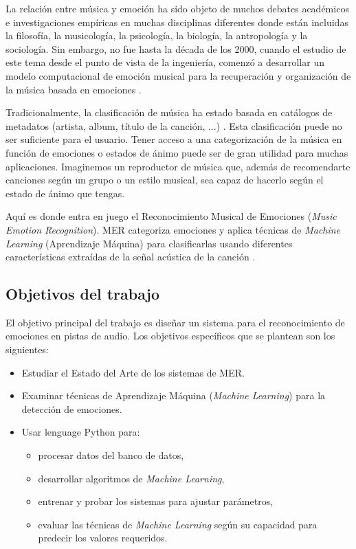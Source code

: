 \documentclass[12pt,a4paper]{article}
\begin{document}
La relación entre música y emoción ha sido objeto de muchos debates académicos e investigaciones empíricas en muchas disciplinas diferentes donde están incluidas la filosofía, la musicología, la psicología, la biología, la antropología y la sociología. Sin embargo, no fue hasta la década de los 2000, cuando el estudio de este tema desde el punto de vista de la ingeniería, comenzó a desarrollar un modelo computacional de emoción musical para la recuperación y organización de la música basada en emociones \cite{yang2011music}.


Tradicionalmente, la clasificación de música ha estado basada en catálogos de metadatos (artista, album, título de la canción, ...) \cite{yang2011music}. Esta clasificación puede no ser suficiente para el usuario. Tener acceso a una categorización de la música en función de emociones o estados de ánimo puede ser de gran utilidad para muchas aplicaciones. Imaginemos un reproductor de música que, además de recomendarte canciones según un grupo o un estilo musical, sea capaz de hacerlo según el estado de ánimo que tengas.


Aquí es donde entra en juego el Reconocimiento Musical de Emociones (\textit{Music Emotion Recognition}). MER categoriza emociones y aplica técnicas de \textit{Machine Learning} (Aprendizaje Máquina) para clasificarlas usando diferentes características extraídas de la señal acústica de la canción \cite{yang2011music}.



\subsection{Objetivos del trabajo}
El objetivo principal del trabajo es diseñar un sistema para el reconocimiento de emociones en pistas de audio.
Los objetivos específicos que se plantean son los siguientes:
\begin{itemize}
\item Estudiar el Estado del Arte de los sistemas de MER.
\item Examinar técnicas de Aprendizaje Máquina (\textit{Machine Learning}) para la detección de emociones.
\item Usar lenguage Python para:
 	\begin{itemize}
 		\item procesar datos del banco de datos, 
 		\item desarrollar algoritmos de \textit{Machine Learning},
 		\item entrenar y probar los sistemas para ajustar parámetros,
 		\item evaluar las técnicas de \textit{Machine Learning} según su capacidad para predecir los valores requeridos. 		
 	\end{itemize}
\end{itemize}
\end{document}
